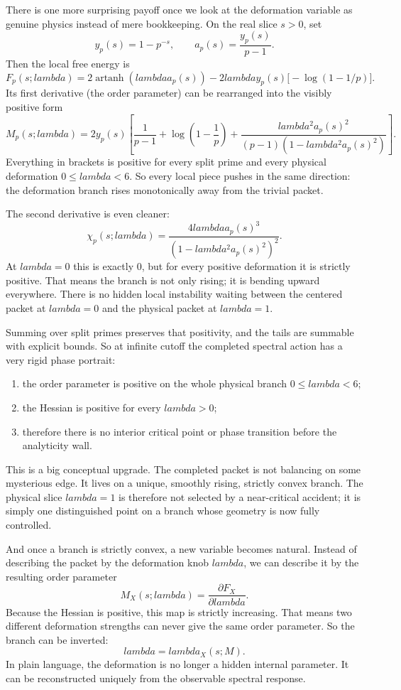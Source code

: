 \documentclass[11pt]{article}
\def\mathcal#1{#1}%
\def\lambda{lambda}%
\begin{document}
There is one more surprising payoff once we look at the deformation variable as genuine physics instead of mere bookkeeping. On the real slice $s>0$, set
\[
y_p(s)=1-p^{-s},
\qquad
a_p(s)=\frac{y_p(s)}{p-1}.
\]
Then the local free energy is
\[
\mathcal F_p(s;\lambda)=2\operatorname{artanh}(\lambda a_p(s))-2\lambda y_p(s)\bigl[-\log(1-1/p)\bigr].
\]
Its first derivative (the order parameter) can be rearranged into the visibly positive form
\[
\mathcal M_p(s;\lambda)=2y_p(s)\left[\frac{1}{p-1}+\log\!\left(1-\frac1p\right)+\frac{\lambda^2 a_p(s)^2}{(p-1)(1-\lambda^2 a_p(s)^2)}\right].
\]
Everything in brackets is positive for every split prime and every physical deformation $0\le\lambda<6$. So every local piece pushes in the same direction: the deformation branch rises monotonically away from the trivial packet.

The second derivative is even cleaner:
\[
\chi_p(s;\lambda)=\frac{4\lambda a_p(s)^3}{(1-\lambda^2 a_p(s)^2)^2}.
\]
At $\lambda=0$ this is exactly $0$, but for every positive deformation it is strictly positive. That means the branch is not only rising; it is bending upward everywhere. There is no hidden local instability waiting between the centered packet at $\lambda=0$ and the physical packet at $\lambda=1$.

Summing over split primes preserves that positivity, and the tails are summable with explicit bounds. So at infinite cutoff the completed spectral action has a very rigid phase portrait:
\begin{enumerate}
\item the order parameter is positive on the whole physical branch $0\le\lambda<6$;
\item the Hessian is positive for every $\lambda>0$;
\item therefore there is no interior critical point or phase transition before the analyticity wall.
\end{enumerate}
This is a big conceptual upgrade. The completed packet is not balancing on some mysterious edge. It lives on a unique, smoothly rising, strictly convex branch. The physical slice $\lambda=1$ is therefore not selected by a near-critical accident; it is simply one distinguished point on a branch whose geometry is now fully controlled.

And once a branch is strictly convex, a new variable becomes natural. Instead of describing the packet by the deformation knob $\lambda$, we can describe it by the resulting order parameter
\[
\mathcal M_X(s;\lambda)=\frac{\partial \mathcal F_X}{\partial\lambda}.
\]
Because the Hessian is positive, this map is strictly increasing. That means two different deformation strengths can never give the same order parameter. So the branch can be inverted:
\[
\lambda = \lambda_X(s;M).
\]
In plain language, the deformation is no longer a hidden internal parameter. It can be reconstructed uniquely from the observable spectral response.
\end{document}
